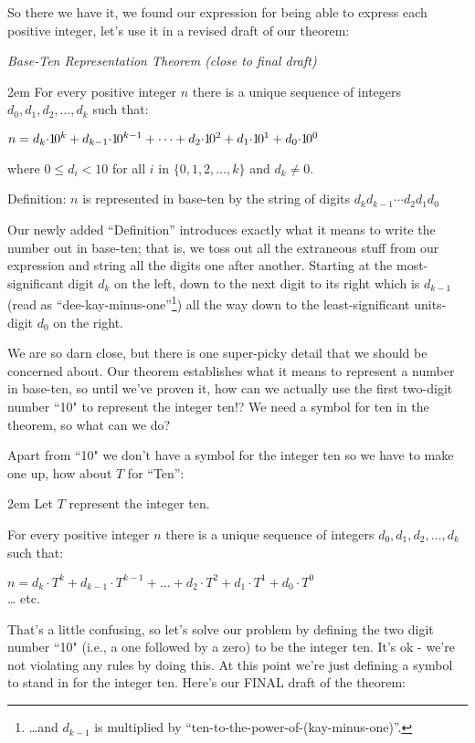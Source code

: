 \documentclass{article}
\newenvironment{jprIn}{\begin{adjustwidth}{2em}{}}{\end{adjustwidth}}
\begin{document}
\break
So there we have it, we found our expression for being able to
express each positive integer, let's use
it in a revised draft of our theorem:

\emph{Base-Ten Representation Theorem (close to final draft)}
\begin{jprIn}
For every positive integer $n$ there is a unique sequence
of integers $d_0, d_1, d_2,\dots{},d_k$ such that:

\hspace{3em}$n=d_k{\cdot}{1\hspace{-0.12em}0}^k+d_{k-1}{\cdot}{1\hspace{-0.12em}0}^{k-1}+\dots+d_2{\cdot}{1\hspace{-0.12em}0}^2+d_1{\cdot}{1\hspace{-0.12em}0}^1+d_0{\cdot}{1\hspace{-0.12em}0}^0$

where $0\le{}d_i<10$ for all $i$ in $\{0,1,2,\dots{},k\}$ and $d_k\ne0$.

Definition: $n$ is represented in base-ten by the string of digits $d_kd_{k-1}{\cdots}d_2d_1d_0$
\end{jprIn}

Our newly added ``Definition'' introduces exactly what it means to write
the number out in base-ten; that is,
we toss out all the extraneous stuff from our expression
and string all the digits one after another.
Starting at the most-significant digit $d_k$ on the left,
down to the next digit to its right which is $d_{k-1}$
(read as ``dee-kay-minus-one''\footnote{\dots{}and $d_{k-1}$ is
multiplied by ``ten-to-the-power-of-(kay-minus-one)''.})
all the way down to the least-significant units-digit $d_0$ on the right.

We are so darn close, but there is one super-picky detail
that we should be concerned about.
Our theorem establishes what it means to represent a number in base-ten, so until
we've proven it, how can we actually use the first two-digit number ``10" to represent
the integer ten!? We need a symbol for ten in the theorem,
so what can we do?

Apart from ``10" we don't have a symbol for the integer ten so
we have to make one up, how about $T$ for ``Ten'':
\begin{jprIn}
Let $T$ represent the integer ten.

For every positive integer $n$ there is a unique sequence
of integers $d_0, d_1, d_2,\dots{},d_k$ such that:

\hspace{3em}$n=d_k{\cdot}{T}^k+d_{k-1}{\cdot}{T}^{k-1}+\dots+d_2{\cdot}{T}^2+d_1{\cdot}{T}^1+d_0{\cdot}{T}^0$\\
\dots{} etc.
\end{jprIn}
That's a little confusing, so 
let's solve our problem by defining the 
two digit number ``10" (i.e., a one followed by a zero) to be the integer ten.
It's ok - we're not violating any rules by doing this. At this point we're just defining
a symbol to stand in for the integer ten. Here's our
FINAL draft of the theorem:
\end{document}
